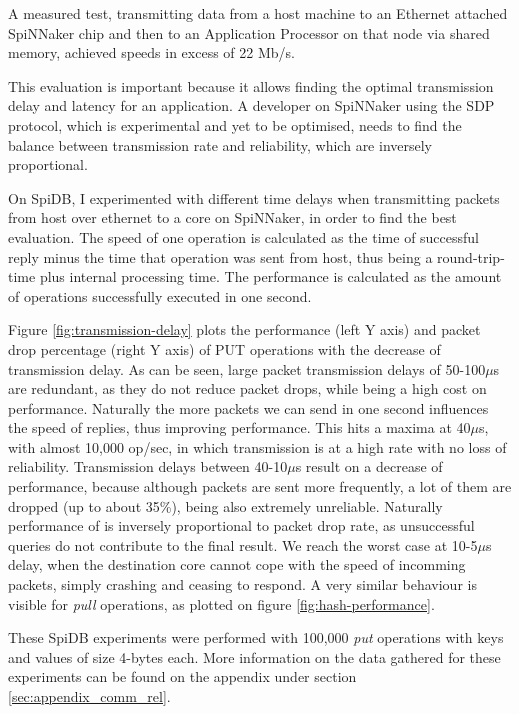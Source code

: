 A measured test, transmitting data from a host machine to an Ethernet attached SpiNNaker chip and then to an Application Processor on that node via shared memory, achieved speeds in excess of 22 Mb/s.\cite{scalablecomm}

This evaluation is important because it allows finding the optimal transmission delay and latency for an application. A developer on SpiNNaker using the SDP protocol, which is experimental and yet to be optimised\cite{scalablecomm}, needs to find the balance between transmission rate and reliability, which are inversely proportional.

On SpiDB, I experimented with different time delays when transmitting packets from host over ethernet to a core on SpiNNaker, in order to find the best evaluation. The speed of one operation is calculated as the time of successful reply minus the time that operation was sent from host, thus being a round-trip-time plus internal processing time. The performance is calculated as the amount of operations successfully executed in one second.

Figure \ref{fig:transmission-delay} plots the performance (left Y axis) and packet drop percentage (right Y axis) of PUT operations  with the decrease of transmission delay. As can be seen, large packet transmission delays of 50-100$\mu$s are redundant, as they do not reduce packet drops, while being a high cost on performance. Naturally the more packets we can send in one second influences the speed of replies, thus improving performance. This hits a maxima at 40$\mu$s, with almost 10,000 op/sec, in which transmission is at a high rate with no loss of reliability. Transmission delays between 40-10$\mu$s result on a decrease of performance, because although packets are sent more frequently, a lot of them are dropped (up to about 35\%), being also extremely unreliable. Naturally performance of is inversely proportional to packet drop rate, as unsuccessful queries do not contribute to the final result. We reach the worst case at 10-5$\mu$s delay, when the destination core cannot cope with the speed of incomming packets, simply crashing and ceasing to respond. A very similar behaviour is visible for \textit{pull} operations, as plotted on figure \ref{fig:hash-performance}.

These SpiDB experiments were performed with 100,000 \textit{put} operations with keys and values of size 4-bytes each. More information on the data gathered for these experiments can be found on the appendix under section \ref{sec:appendix_comm_rel}.

